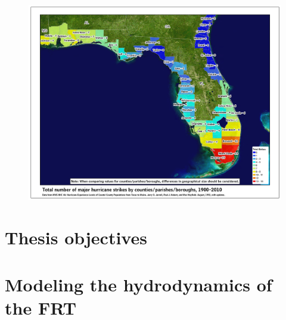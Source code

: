 \documentclass[12pt ,a4paper]{article}
\begin{document}
\begin{figure}
    \centering
    \includegraphics[width=\textwidth]{figures/hurricane_strikes.jpg}
    \caption{}
    \label{inro:landfall}
\end{figure}

\section{Thesis objectives}

\section{Modeling the hydrodynamics of the FRT}



 

\end{document}
